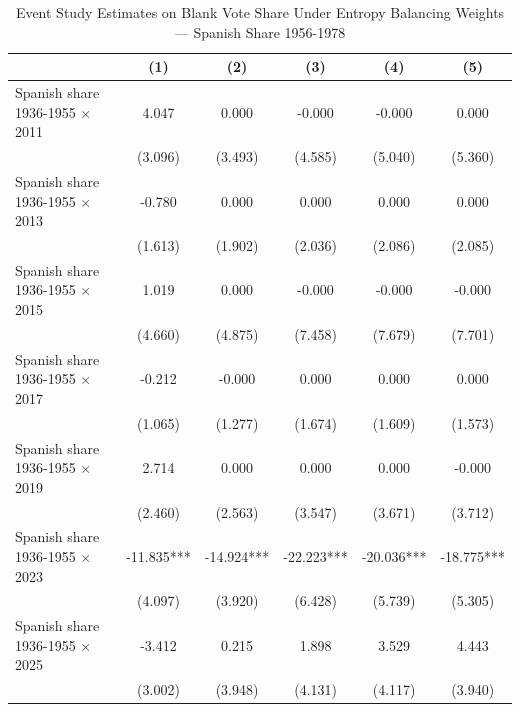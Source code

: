 \begin{table}[!h]
\caption{Event Study Estimates on Blank Vote Share Under Entropy Balancing Weights — Spanish Share 1956-1978}
\renewcommand{\arraystretch}{1.25}
\centering
\begin{tabular}[t]{lccccc}
\hline
  & (1) & (2) & (3) & (4) & (5)\\
\hline
Spanish share 1936-1955 $\times$ 2011 & 4.047 & 0.000 & -0.000 & -0.000 & 0.000\\
 & (3.096) & (3.493) & (4.585) & (5.040) & (5.360)\\
Spanish share 1936-1955 $\times$ 2013 & -0.780 & 0.000 & 0.000 & 0.000 & 0.000\\
 & (1.613) & (1.902) & (2.036) & (2.086) & (2.085)\\
Spanish share 1936-1955 $\times$ 2015 & 1.019 & 0.000 & -0.000 & -0.000 & -0.000\\
 & (4.660) & (4.875) & (7.458) & (7.679) & (7.701)\\
Spanish share 1936-1955 $\times$ 2017 & -0.212 & -0.000 & 0.000 & 0.000 & 0.000\\
 & (1.065) & (1.277) & (1.674) & (1.609) & (1.573)\\
Spanish share 1936-1955 $\times$ 2019 & 2.714 & 0.000 & 0.000 & 0.000 & -0.000\\
 & (2.460) & (2.563) & (3.547) & (3.671) & (3.712)\\
Spanish share 1936-1955 $\times$ 2023 & -11.835*** & -14.924*** & -22.223*** & -20.036*** & -18.775***\\
 & (4.097) & (3.920) & (6.428) & (5.739) & (5.305)\\
Spanish share 1936-1955 $\times$ 2025 & -3.412 & 0.215 & 1.898 & 3.529 & 4.443\\
 & (3.002) & (3.948) & (4.131) & (4.117) & (3.940)\\


\end{tabular}
\end{table}
